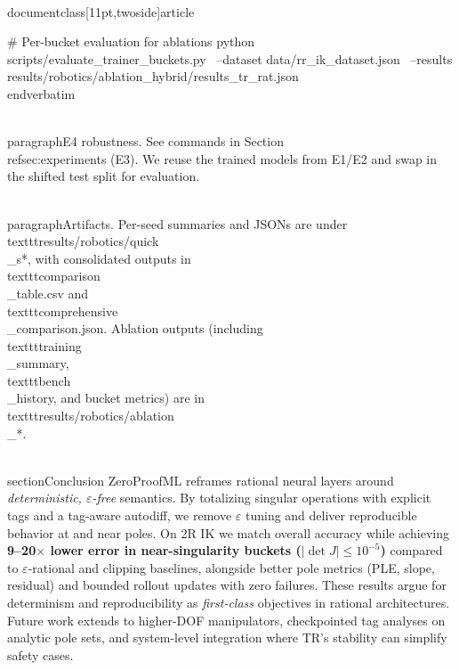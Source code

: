 \\documentclass[11pt,twoside]{article}
\begin{document}
# Per-bucket evaluation for ablations
python scripts/evaluate_trainer_buckets.py \
  --dataset data/rr_ik_dataset.json \
  --results results/robotics/ablation_hybrid/results_tr_rat.json
\\end{verbatim}

\\paragraph{E4 robustness.}
See commands in Section~\\ref{sec:experiments} (E3). We reuse the trained models from E1/E2 and swap in the shifted test split for evaluation.

\\paragraph{Artifacts.} Per-seed summaries and JSONs are under \\texttt{results/robotics/quick\\_s*}, with consolidated outputs in \\texttt{comparison\\_table.csv} and \\texttt{comprehensive\\_comparison.json}. Ablation outputs (including \\texttt{training\\_summary}, \\texttt{bench\\_history}, and bucket metrics) are in \\texttt{results/robotics/ablation\\_*}.

\\section{Conclusion}
ZeroProofML reframes rational neural layers around \emph{deterministic, $\varepsilon$-free} semantics. By totalizing singular operations with explicit tags and a tag-aware autodiff, we remove $\varepsilon$ tuning and deliver reproducible behavior at and near poles. On 2R IK we match overall accuracy while achieving \textbf{9--20$\times$ lower error in near-singularity buckets ($|\det J|\le10^{-5}$)} compared to $\varepsilon$-rational and clipping baselines, alongside better pole metrics (PLE, slope, residual) and bounded rollout updates with zero failures. These results argue for determinism and reproducibility as \emph{first-class} objectives in rational architectures. Future work extends to higher-DOF manipulators, checkpointed tag analyses on analytic pole sets, and system-level integration where TR’s stability can simplify safety cases.
\end{document}
